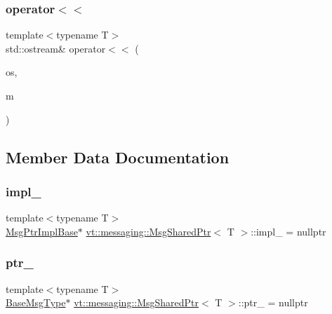 \subsubsection{\texorpdfstring{operator$<$$<$}{operator<<}}
{\footnotesize\ttfamily template$<$typename T$>$ \\
std\+::ostream\& operator$<$$<$ (\begin{DoxyParamCaption}\item[{std\+::ostream \&}]{os,  }\item[{\hyperlink{structvt_1_1messaging_1_1_msg_shared_ptr}{Msg\+Shared\+Ptr}$<$ T $>$ const \&}]{m }\end{DoxyParamCaption})\hspace{0.3cm}{\ttfamily [friend]}}



\subsection{Member Data Documentation}
\mbox{\label{structvt_1_1messaging_1_1_msg_shared_ptr_aa0cf96203c13d77d691888c852bc333e}} 
\subsubsection{\texorpdfstring{impl\+\_\+}{impl\_}}
{\footnotesize\ttfamily template$<$typename T$>$ \\
\hyperlink{structvt_1_1messaging_1_1_msg_ptr_impl_base}{Msg\+Ptr\+Impl\+Base}$\ast$ \hyperlink{structvt_1_1messaging_1_1_msg_shared_ptr}{vt\+::messaging\+::\+Msg\+Shared\+Ptr}$<$ T $>$\+::impl\+\_\+ = nullptr\hspace{0.3cm}{\ttfamily [private]}}

\mbox{\label{structvt_1_1messaging_1_1_msg_shared_ptr_aac5218a8b39004946a523ac4a729a3da}} 
\subsubsection{\texorpdfstring{ptr\+\_\+}{ptr\_}}
{\footnotesize\ttfamily template$<$typename T$>$ \\
\hyperlink{structvt_1_1messaging_1_1_msg_shared_ptr_a778cb9ec8919e4a309d28ed345ac318d}{Base\+Msg\+Type}$\ast$ \hyperlink{structvt_1_1messaging_1_1_msg_shared_ptr}{vt\+::messaging\+::\+Msg\+Shared\+Ptr}$<$ T $>$\+::ptr\+\_\+ = nullptr\hspace{0.3cm}{\ttfamily [private]}}

